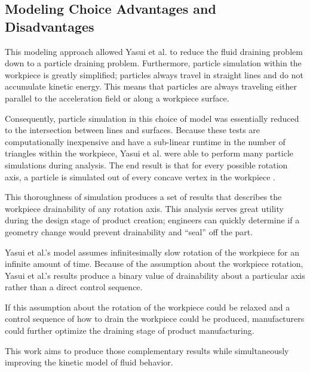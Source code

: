 	\subsection{Modeling Choice Advantages and Disadvantages}

This modeling approach allowed Yasui et al. to reduce the fluid draining problem down to a particle draining problem. Furthermore, particle simulation within the workpiece is greatly simplified; particles always travel in straight lines and do not accumulate kinetic energy. This means that particles are always traveling either parallel to the acceleration field or along a workpiece surface.

Consequently, particle simulation in this choice of model was essentially reduced to the intersection between lines and surfaces. Because these tests are computationally inexpensive and have a sub-linear runtime in the number of triangles within the workpiece, Yasui et al. were able to perform many particle simulations during analysis. The end result is that for every possible rotation axis, a particle is simulated out of every concave vertex in the workpiece \cite{Yasui2011}.

This thoroughness of simulation produces a set of results that describes the workpiece drainability of any rotation axis. This analysis serves great utility during the design stage of product creation; engineers can quickly determine if a geometry change would prevent drainability and ``seal'' off the part.

Yasui et al.'s model assumes infinitesimally slow rotation of the workpiece for an infinite amount of time. Because of the assumption about the workpiece rotation, Yasui et al.'s results produce a binary value of drainability about a particular axis rather than a direct control sequence.

If this assumption about the rotation of the workpiece could be relaxed and a  control sequence of how to drain the workpiece could be produced, manufacturers could further optimize the draining stage of product manufacturing.

This work aims to produce those complementary results while simultaneously improving the kinetic model of fluid behavior.




